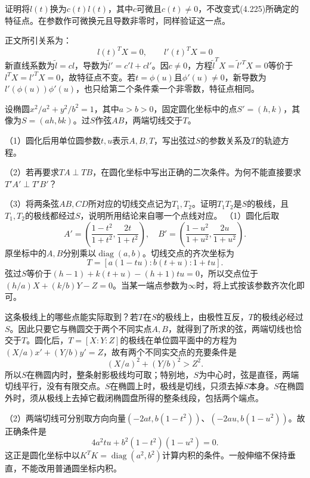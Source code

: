 证明将\(l(t)\)换为\(c(t)l(t)\)，其中\(c\)可微且\(c(t)\ne0\)，不改变式\textup{(4.225)}所确定的特征点。在参数作可微换元且导数非零时，同样验证这一点。

\par\smallskip\noindent 正文所引关系为：
\begin{equation*}
l(t)^TX=0,\qquad l'(t)^TX=0
\end{equation*}
\solutionanswer
新直线系数为\(\widetilde l=cl\)，导数为\(\widetilde l'=c'l+cl'\)。因\(c\ne0\)，方程\(\widetilde l^TX=\widetilde l'^TX=0\)等价于\(l^TX=l'^TX=0\)，故特征点不变。若\(t=\phi(u)\)且\(\phi'(u)\ne0\)，新导数为\(l'(\phi(u))\phi'(u)\)，也只给第二个条件乘一个非零数，特征点相同。


设椭圆\(x^2/a^2+y^2/b^2=1\)，其中\(a>b>0\)，固定圆化坐标中的点\(S'=(h,k)\)，其像为\(S=(ah,bk)\)。过\(S\)作弦\(AB\)，两端切线交于\(T\)。

（1）圆化后用单位圆参数\(t,u\)表示\(A,B,T\)，写出弦过\(S\)的参数关系及\(T\)的轨迹方程。

（2）若再要求\(TA\perp TB\)，在圆化坐标中写出正确的二次条件。为何不能直接要求\(T'A'\perp T'B'\)？

（3）将两条弦\(AB,CD\)所对应的切线交点记为\(T_1,T_2\)。证明\(T_1T_2\)是\(S\)的极线，且\(T_1,T_2\)的极线都经过\(S\)，说明所用结论来自哪一个点线对应。
\solutionanswer
（1）圆化后取
\[
 A'=\left(\frac{1-t^2}{1+t^2},\frac{2t}{1+t^2}\right),\quad
 B'=\left(\frac{1-u^2}{1+u^2},\frac{2u}{1+u^2}\right).
\]
原坐标中的\(A,B\)分别乘以\(\operatorname{diag}(a,b)\)。切线交点的齐次坐标为
\[
 T=[a(1-tu):b(t+u):1+tu].
\]
弦过\(S\)等价于\((h-1)+k(t+u)-(h+1)tu=0\)，所以交点位于\((h/a)X+(k/b)Y-Z=0\)。当某一端点参数为\(\infty\)时，将上式按该参数齐次化即可。

这条极线上的哪些点能实际取到？若\(T\)在\(S\)的极线上，由极性互反，\(T\)的极线必经过\(S\)。因此只要它与椭圆交于两个不同实点\(A,B\)，就得到了所求的弦，两端切线也恰交于\(T\)。圆化后，\(T=[X:Y:Z]\)的极线在单位圆平面中的方程为\((X/a)x'+(Y/b)y'=Z\)，故有两个不同实交点的充要条件是
\[
 (X/a)^2+(Y/b)^2>Z^2.
\]
所以\(S\)在椭圆内时，整条射影极线均可取；特别地，\(S\)为中心时，弦是直径，两端切线平行，没有有限交点。\(S\)在椭圆上时，极线是切线，只须去掉\(S\)本身。\(S\)在椭圆外时，须从极线上去掉它截闭椭圆盘所得的整条线段，包括两个端点。

（2）两端切线可分别取方向向量\((-2at,b(1-t^2))\)、\((-2au,b(1-u^2))\)。故正确条件是
\[
 4a^2tu+b^2(1-t^2)(1-u^2)=0.
\]
这正是圆化坐标中以\(K^TK=\operatorname{diag}(a^2,b^2)\)计算内积的条件。一般伸缩不保持垂直，不能改用普通圆坐标内积。

